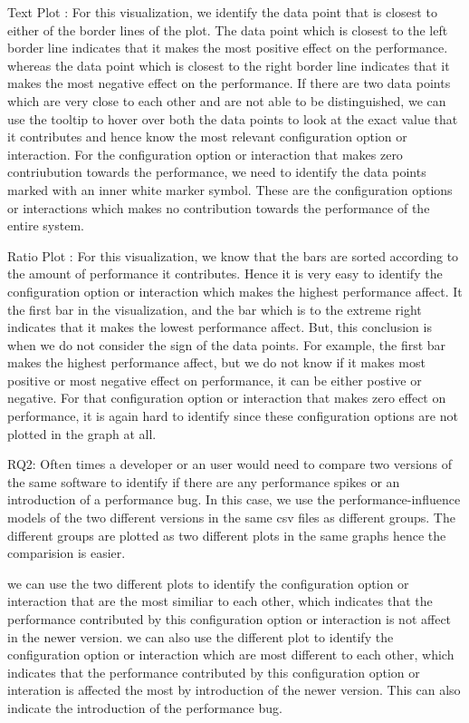  Text Plot : For this visualization, we identify the data point that is closest to either of the border lines of the plot. The data point which is closest to the left border line indicates that it makes the most positive effect on the performance. whereas the data point which is closest to the right border line indicates that it makes the most negative effect on the performance. If there are two data points which are very close to each other and are not able to be distinguished, we can use the tooltip to hover over both the data points to look at the exact value that it contributes and hence know the most relevant configuration option or interaction. For the configuration option or interaction that makes zero contriubution towards the performance, we need to identify the data points marked with an inner white marker symbol. These are the configuration options or interactions which makes no contribution towards the performance of the entire system.

 Ratio Plot : For this visualization, we know that the bars are sorted according to the amount of performance it contributes. Hence it is very easy to identify the configuration option or interaction which makes the highest performance affect. It the first bar in the visualization, and the bar which is to the extreme right indicates that it makes the lowest performance affect. But, this conclusion is when we do not consider the sign of the data points. For example, the first bar makes the highest performance affect, but we do not know if it makes most positive or most negative effect on performance, it can be either postive or negative. For that configuration option or interaction that makes zero effect on performance, it is again hard to identify since these configuration options are not plotted in the graph at all.

RQ2: Often times a developer or an user would need to compare two versions of the same software to identify if there are any performance spikes or an introduction of a performance bug. In this case, we use the performance-influence models of the two different versions in the same csv files as different groups. The different groups are plotted as two different plots in the same graphs hence the comparision is easier.


we can use the two different plots to identify the configuration option or interaction that are the most similiar to each other, which indicates that the performance contributed by this configuration option or interaction is not affect in the newer version. we can also use the different plot to identify the configuration option or interaction which are most different to each other, which indicates that the performance contributed by this configuration option or interation is affected the most by introduction of the newer version. This can also indicate the introduction of the performance bug.

